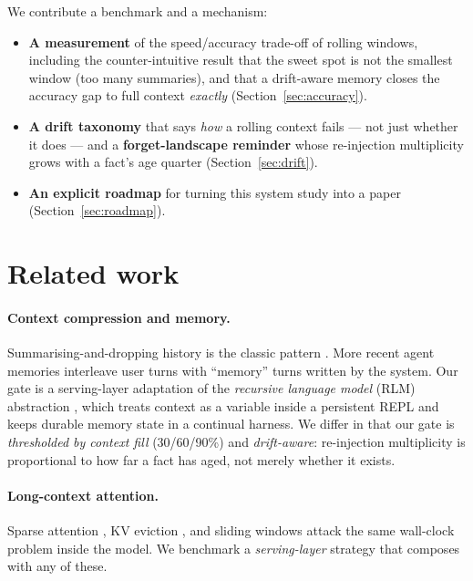 \documentclass{article}
\begin{document}
We contribute a benchmark and a mechanism:

\begin{itemize}
\item \textbf{A measurement} of the speed/accuracy trade-off of rolling windows,
  including the counter-intuitive result that the sweet spot is not the smallest
  window (too many summaries), and that a drift-aware memory closes the accuracy gap to
  full context \emph{exactly} (Section~\ref{sec:accuracy}).
\item \textbf{A drift taxonomy} that says \emph{how} a rolling context fails --- not
  just whether it does --- and a \textbf{forget-landscape reminder} whose re-injection
  multiplicity grows with a fact's age quarter (Section~\ref{sec:drift}).
\item \textbf{An explicit roadmap} for turning this system study into a paper
  (Section~\ref{sec:roadmap}).
\end{itemize}

\section{Related work}

\paragraph{Context compression and memory.}
Summarising-and-dropping history is the classic pattern \citep{wu2022recursively,
xu2023notion}. More recent agent memories \citep{park2023generative,
memgpt2023memgpt} interleave user turns with ``memory'' turns written by the system.
Our gate is a serving-layer adaptation of the \emph{recursive language model} (RLM)
abstraction \citep{primeagent2026}, which treats context as a variable inside a
persistent REPL and keeps durable memory state in a continual harness. We differ in
that our gate is \emph{thresholded by context fill} (30/60/90\%) and \emph{drift-aware}:
re-injection multiplicity is proportional to how far a fact has aged, not merely whether
it exists.

\paragraph{Long-context attention.}
Sparse attention \citep{child2019generating, beltagy2020longformer}, KV eviction
\citep{zhang2024quantization,ge2024modeling}, and sliding windows
\citep{beltagy2020longformer} attack the same wall-clock problem inside the model. We
benchmark a \emph{serving-layer} strategy that composes with any of these.
\end{document}
